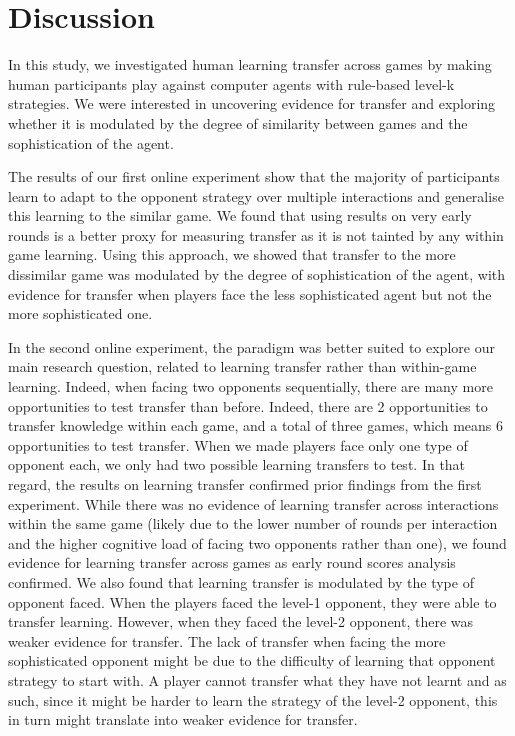 \documentclass[man,floatsintext]{apa6}
\begin{document}
\newpage

\hypertarget{discussion}{%
\section{Discussion}\label{discussion}}

In this study, we investigated human learning transfer across games by making human participants play against computer agents with rule-based level-k strategies. We were interested in uncovering evidence for transfer and exploring whether it is modulated by the degree of similarity between games and the sophistication of the agent.

The results of our first online experiment show that the majority of participants learn to adapt to the opponent strategy over multiple interactions and generalise this learning to the similar game. We found that using results on very early rounds is a better proxy for measuring transfer as it is not tainted by any within game learning. Using this approach, we showed that transfer to the more dissimilar game was modulated by the degree of sophistication of the agent, with evidence for transfer when players face the less sophisticated agent but not the more sophisticated one.

In the second online experiment, the paradigm was better suited to explore our main research question, related to learning transfer rather than within-game learning. Indeed, when facing two opponents sequentially, there are many more opportunities to test transfer than before. Indeed, there are 2 opportunities to transfer knowledge within each game, and a total of three games, which means 6 opportunities to test transfer. When we made players face only one type of opponent each, we only had two possible learning transfers to test. In that regard, the results on learning transfer confirmed prior findings from the first experiment. While there was no evidence of learning transfer across interactions within the same game (likely due to the lower number of rounds per interaction and the higher cognitive load of facing two opponents rather than one), we found evidence for learning transfer across games as early round scores analysis confirmed. We also found that learning transfer is modulated by the type of opponent faced. When the players faced the level-1 opponent, they were able to transfer learning. However, when they faced the level-2 opponent, there was weaker evidence for transfer. The lack of transfer when facing the more sophisticated opponent might be due to the difficulty of learning that opponent strategy to start with. A player cannot transfer what they have not learnt and as such, since it might be harder to learn the strategy of the level-2 opponent, this in turn might translate into weaker evidence for transfer.
\end{document}
